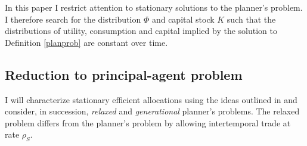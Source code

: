 \documentclass[11pt]{article}
\theoremstyle{plain}
\theoremstyle{definition} %
\begin{document}
In this paper I restrict attention to stationary solutions to the planner's problem. I therefore search for the distribution $\Phi$ and capital stock $K$ such that the distributions of utility, consumption and capital implied by the solution to Definition \ref{planprob} are constant over time. 

\subsection{Reduction to principal-agent problem}\label{reduct}

I will characterize stationary efficient allocations using the ideas outlined in \cite{farhi_inequality_2007} and consider, in succession, \emph{relaxed} and \emph{generational} planner's problems. The relaxed problem differs from the planner's problem by allowing intertemporal trade at rate $\rho_S$.
\end{document}
